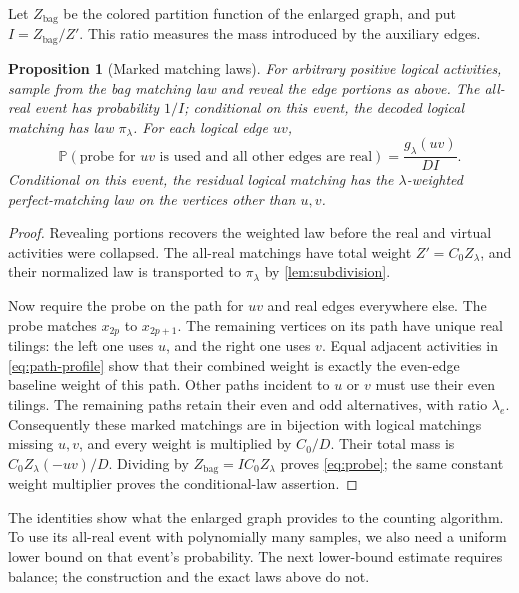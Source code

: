\documentclass[11pt]{article}
\newtheorem{proposition}[theorem]{Proposition}
\theoremstyle{definition}
\theoremstyle{remark}
\newcommand{\Prb}{\mathbb P}
\numberwithin{equation}{section}
\begin{document}
Let $Z_{\mathrm{bag}}$ be the colored partition function of the enlarged
graph, and put $I=Z_{\mathrm{bag}}/Z'$. This ratio measures the mass
introduced by the auxiliary edges.

\begin{proposition}[Marked matching laws]\label{prop:marked-laws}
For arbitrary positive logical activities, sample from the bag matching
law and reveal the edge portions as above. The all-real event has
probability $1/I$;
conditional on this event, the decoded logical matching has law
$\pi_\lambda$. For each logical edge $uv$,
\begin{equation}\label{eq:probe}
 \Prb(\text{probe for }uv\text{ is used and all other edges are real})
 =\frac{g_\lambda(uv)}{DI}.
\end{equation}
Conditional on this event, the residual logical matching has the
$\lambda$-weighted perfect-matching law on the vertices other than
$u,v$.
\end{proposition}

\begin{proof}
Revealing portions recovers the weighted law before the real and virtual
activities were collapsed. The all-real matchings have total weight
$Z'=C_0Z_\lambda$, and their normalized law is transported to
$\pi_\lambda$ by \cref{lem:subdivision}.

Now require the probe on the path for $uv$ and real edges everywhere
else. The probe matches $x_{2p}$ to $x_{2p+1}$. The remaining vertices on
its path have unique real tilings: the left one uses $u$, and the right
one uses $v$. Equal adjacent activities in \eqref{eq:path-profile}
show that their combined weight is exactly the even-edge baseline
weight of this path. Other paths incident to $u$ or $v$ must use their
even tilings. The remaining paths retain their even and odd alternatives,
with ratio $\lambda_e$. Consequently these marked
matchings are in bijection with logical matchings missing $u,v$,
and every weight is multiplied by $C_0/D$. Their total mass is
$C_0 Z_\lambda(-uv)/D$. Dividing by $Z_{\mathrm{bag}}=IC_0Z_\lambda$
proves \eqref{eq:probe}; the same constant weight multiplier proves
the conditional-law assertion.
\end{proof}

The identities show what the enlarged graph provides to the counting
algorithm. To use its all-real event with polynomially many samples,
we also need a uniform lower bound on that event's probability.
The next lower-bound estimate requires balance; the construction and
the exact laws above do not.
\end{document}
